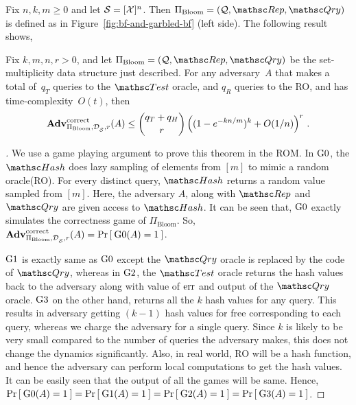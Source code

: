 Fix $n,k,m \geq 0$ and let $\mathcal{S}=[{\cal X}]^n$.  Then $\Pi_{\mathrm{Bloom}}= (\calQ,\Rep, \Qry)$ is defined as in Figure~\ref{fig:bf-and-garbled-bf} (left side).  The following result shows,
\begin{theorem}\label{thm3}
Fix $k,m,n,r>0$, and let $\Pi_{\mathrm{Bloom}}= (\calQ,\Rep, \Qry)$ be the set-multiplicity data structure just described. For any adversary~$A$ that makes a total of~$q_T$ queries to the $\Test$ oracle, and $q_R$ queries to the RO, and has time-complexity~$O(t)$, then
\[
\mathrm{\mathbf{Adv}}^{\mathrm{correct}}_{\Pi_{\mathrm{Bloom}},\mathcal{D}_{{\cal S}}^{},r}(A) \leq  {\dbinom{q_T + q_H}{r}} \left( (1-e^{-kn/m})^k + O(1/n) \right)^r\,.
\]
\end{theorem}

\begin{proof}[]
We use a game playing argument to prove this theorem in the ROM. In $\text{G0}$, the $\Hash$ does lazy sampling of elements from $[m]$ to mimic a random oracle(RO). For every distinct query, $\Hash$ returns a random value sampled from $[m]$. Here, the adversary $A$, along with $\Rep$ and $\Qry$ are given access to $\Hash$. It can be seen that, $\text{G0}$ exactly simulates the correctness game of $\Pi_{\mathrm{Bloom}}$. So, $\mathrm{\mathbf{Adv}}^{\mathrm{correct}}_{\Pi_{\mathrm{Bloom}},\mathcal{D}_{{\cal S}}^{},r}(A) = \Pr\left[\: \text{G0}(A) = 1 \:\right]$.

$\text{G1}$ is exactly same as $\text{G0}$ except the $\Qry$ oracle is replaced by the code of $\Qry$, whereas in $\text{G2}$, the $\Test$ oracle returns the hash values back to the adversary along with value of $\mathrm{err}$ and output of the $\Qry$ oracle. $\text{G3}$ on the other hand, returns all the $k$ hash values for any query. This results in adversary getting $(k-1)$ hash values for free corresponding to each query, whereas we charge the adversary for a single query. Since $k$ is likely to be very small compared to the number of queries the adversary makes, this does not change the dynamics significantly. Also, in real world, RO will be a hash function, and hence the adversary can perform local computations to get the hash values. It can be easily seen that the output of all the games will be same. Hence, $\Pr\left[\: \text{G0}(A) = 1 \:\right] = \Pr\left[\: \text{G1}(A) = 1 \:\right] = \Pr\left[\: \text{G2}(A) = 1 \:\right] = \Pr\left[\: \text{G3}(A) = 1 \:\right]$. 


\end{proof}
